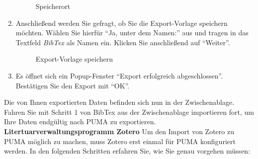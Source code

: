 \begin{enumerate}
\begin{figure}[h!]
 \centering
 \caption{Speicherort}
 \label{fig:speicherort}
\end{figure}
    \item Anschließend werden Sie gefragt, ob Sie die Export-Vorlage speichern möchten. Wählen Sie hierfür \enquote{Ja, unter dem Namen:} aus und tragen in das Textfeld \textit{BibTex} als Namen ein. Klicken Sie anschließend auf \enquote{Weiter}.
   
\begin{figure}[h!]
 \centering
 \caption{Export-Vorlage speichern}
 \label{fig:exportVorlageSpeichern}
\end{figure}
    \item Es öffnet sich ein Popup-Fenster \enquote{Export erfolgreich abgeschlossen}. Bestätigen Sie den Export mit \enquote{OK}.
\end{enumerate}
Die von Ihnen exportierten Daten befinden sich nun in der Zwischenablage. Fahren Sie mit Schritt 1 von BibTex aus der Zwischenablage importieren fort, um Ihre Daten endgültig nach PUMA zu exportieren.\newline
\newline
\textbf{Litertuarverwaltungsprogramm Zotero} 
\newline \newline
Um den Import von Zotero zu PUMA möglich zu machen, muss Zotero erst einmal für PUMA konfiguriert werden. In den folgenden Schritten erfahren Sie, wie Sie genau vorgehen müssen:
